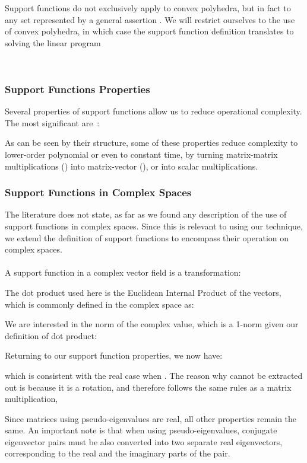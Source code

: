 \documentclass{IEEEtran}
\begin{document}
Support functions do not exclusively apply to convex polyhedra, 
but in fact to any set  represented by a general assertion . 
We will restrict ourselves to the use of 
convex polyhedra, in which case the support function definition translates to solving the linear program

\\
\subsubsection{Support Functions Properties}\label{sec:support_properties}


Several properties of support functions allow us to reduce operational
complexity.  The most significant
are~\cite{DBLP:dblp_journals/cviu/GhoshK98}:

As can be seen by their structure, some of these properties reduce
complexity to lower-order polynomial 
or even to constant time, by turning matrix-matrix multiplications () into matrix-vector (), 
or into scalar multiplications.

\subsubsection{Support Functions in Complex Spaces}\label{sec:support_complex}


The literature does not state, as far as we found any description of the use of support functions in complex spaces. 
Since this is relevant to using our technique, we extend the definition of support functions to encompass their operation
on complex spaces.\\
\\
A support function in a complex vector field is a transformation:

The dot product used here is the Euclidean Internal Product of the vectors,
which is commonly defined in the complex space as:

We are interested in the norm of the complex value, which is a 1-norm given our definition of dot product:


 Returning to our support function properties, we now have:

which is consistent with the real case when .  
The reason why  cannot be extracted out is because it is
a rotation, and therefore follows the same rules as a matrix
multiplication,  

Since matrices using pseudo-eigenvalues are real, all other properties remain the same. 
An important note is that when using pseudo-eigenvalues, 
conjugate eigenvector pairs must be also converted into two separate real eigenvectors, 
corresponding to the real and the imaginary parts of the pair. 
\end{document}
